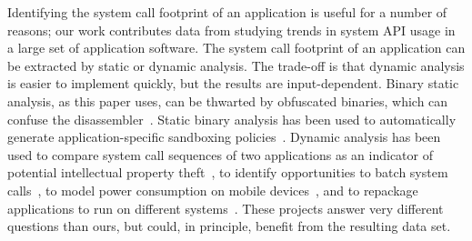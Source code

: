 
Identifying the system call footprint of an application is useful for a number of reasons;
our work contributes data from studying trends in system API usage in a large set of application software.
The system call footprint of an application can be extracted by static or dynamic analysis.
The trade-off is that dynamic analysis is easier to implement quickly, but the results are input-dependent.
Binary static analysis, as this paper uses, 
can be thwarted by obfuscated binaries,
which can confuse the disassembler~\citep{zhang13cfi}.
Static binary analysis has been used to automatically generate application-specific sandboxing 
policies~\citep{policy-extraction}.
Dynamic analysis has been used to compare system call sequences of two applications
as an indicator of potential intellectual property theft~\citep{software-theft},
to identify opportunities to batch system calls~\citep{multi-call},
to model power consumption on mobile devices~\citep{power-modelling},
and to repackage applications to run on different systems~\citep{cde}.
These projects answer very different questions than ours, but could, in principle, benefit
from the resulting data set.


